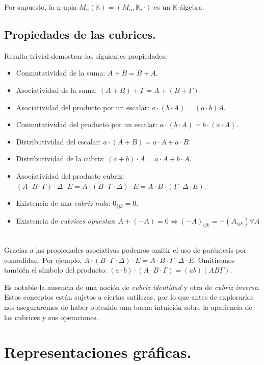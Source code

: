 \documentclass[a4paper, titlepage]{article}
\begin{document}
Por supuesto, la n-upla $M_n (\mathbb{K}) = (M_n, \mathbb{K}, \cdot)$ es un $\mathbb{K}$-álgebra.

\subsection{Propiedades de las cubrices.}

Resulta trivial demostrar las siguientes propiedades:

\begin{itemize}
	\item Conmutatividad de la suma: $A + B = B + A$.
	\item Asociatividad de la suma: $(A + B) + \Gamma = A + (B + \Gamma)$.
	\item Asociatividad del producto por un escalar: $a\cdot (b\cdot A) = (a\cdot b)A$.
	\item Conmutatividad del producto por un escalar: $a\cdot (b\cdot A) = b\cdot (a\cdot A)$.
	\item Distributividad del escalar: $a\cdot (A + B) = a\cdot A + a\cdot B$.
	\item Distributividad de la cubriz: $(a + b)\cdot A = a\cdot A + b\cdot A$.
	\item Asociatividad del producto cubriz: $(A \cdot B \cdot \Gamma) \cdot \Delta \cdot E = A \cdot (B \cdot \Gamma \cdot \Delta) \cdot E = A \cdot B \cdot (\Gamma \cdot \Delta \cdot E)$.
	\item Existencia de una \textit{cubriz nula}: $0_{ijk} = 0$.
	\item Existencia de \textit{cubrices opuestas}: $A + (-A) = 0 \Leftrightarrow (-A)_{ijk} = -(A_{ijk}) \forall A$.
\end{itemize}

Gracias a las propiedades asociativas podemos omitir el uso de paréntesis por comodidad. Por ejemplo, $A \cdot (B \cdot \Gamma \cdot \Delta) \cdot E = A \cdot B \cdot \Gamma \cdot \Delta \cdot E$. Omitiremos también el símbolo del producto: $(a\cdot b)\cdot (A \cdot B \cdot \Gamma) = (ab)(AB\Gamma)$.

Es notable la ausencia de una noción de \textit{cubriz identidad} y otra de \textit{cubriz inversa}. Estos conceptos están sujetos a ciertas sutilezas, por lo que antes de explorarlos nos aseguraremos de haber obtenido una buena intuición sobre la apariencia de las cubrices y sus operaciones.

\section{Representaciones gráficas.}
\end{document}
